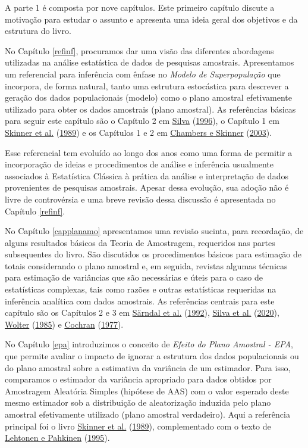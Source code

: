 \documentclass[
  12pt,
  brazilian,
]{book}
\theoremstyle{definition}
\theoremstyle{definition}
\theoremstyle{definition}
\theoremstyle{definition}
\theoremstyle{remark}
\begin{document}
A parte 1 é composta por nove capítulos. Este primeiro capítulo discute a motivação para estudar o assunto e apresenta uma ideia geral dos objetivos e da estrutura do livro.

No Capítulo \ref{refinf}, procuramos dar uma visão das diferentes abordagens utilizadas na análise estatística de dados de pesquisas amostrais. Apresentamos um referencial para inferência com ênfase no \emph{Modelo de Superpopulação} que incorpora, de forma natural, tanto uma estrutura estocástica para descrever a geração dos dados populacionais (modelo) como o plano amostral efetivamente utilizado para obter os dados amostrais (plano amostral). As referências básicas para seguir este capítulo são o Capítulo 2 em \protect\hyperlink{ref-Silva}{Silva} (\protect\hyperlink{ref-Silva}{1996}), o Capítulo 1 em \protect\hyperlink{ref-SHS89}{Skinner et al.} (\protect\hyperlink{ref-SHS89}{1989}) e os Capítulos 1 e 2 em \protect\hyperlink{ref-CHSK2003}{Chambers e Skinner} (\protect\hyperlink{ref-CHSK2003}{2003}).

Esse referencial tem evoluído ao longo dos anos como uma forma de permitir a incorporação de ideias e procedimentos de análise e inferência usualmente associados à Estatística Clássica à prática da análise e interpretação de dados provenientes de pesquisas amostrais. Apesar dessa evolução, sua adoção não é livre de controvérsia e uma breve revisão dessa discussão é apresentada no Capítulo \ref{refinf}.

No Capítulo \ref{capplanamo} apresentamos uma revisão sucinta, para recordação, de alguns resultados básicos da Teoria de Amostragem, requeridos nas partes subsequentes do livro. São discutidos os procedimentos básicos para estimação de totais considerando o plano amostral e, em seguida, revistas algumas técnicas para estimação de variâncias que são necessárias e úteis para o caso de estatísticas complexas, tais como razões e outras estatísticas requeridas na inferência analítica com dados amostrais. As referências centrais para este capítulo são os Capítulos 2 e 3 em \protect\hyperlink{ref-SSW92}{Särndal et al.} (\protect\hyperlink{ref-SSW92}{1992}), \protect\hyperlink{ref-Silva2020}{Silva et al.} (\protect\hyperlink{ref-Silva2020}{2020}), \protect\hyperlink{ref-W85}{Wolter} (\protect\hyperlink{ref-W85}{1985}) e \protect\hyperlink{ref-cochran}{Cochran} (\protect\hyperlink{ref-cochran}{1977}).

No Capítulo \ref{epa} introduzimos o conceito de \emph{Efeito do Plano Amostral - EPA}, que permite avaliar o impacto de ignorar a estrutura dos dados populacionais ou do plano amostral sobre a estimativa da variância de um estimador. Para isso, comparamos o estimador da variância apropriado para dados obtidos por Amostragem Aleatória Simples (hipótese de AAS) com o valor esperado deste mesmo estimador sob a distribuição de aleatorização induzida pelo plano amostral efetivamente utilizado (plano amostral verdadeiro). Aqui a referência principal foi o livro \protect\hyperlink{ref-SHS89}{Skinner et al.} (\protect\hyperlink{ref-SHS89}{1989}), complementado com o texto de \protect\hyperlink{ref-lethonen}{Lehtonen e Pahkinen} (\protect\hyperlink{ref-lethonen}{1995}).
\end{document}
